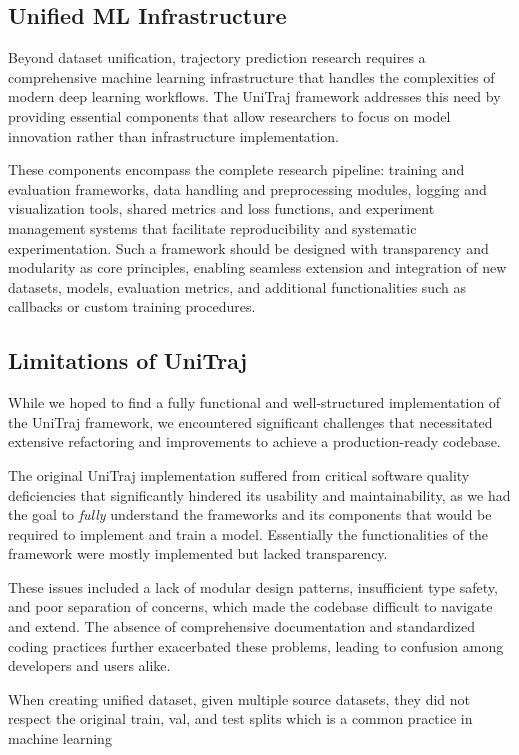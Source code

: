 \subsection{Unified ML Infrastructure}
Beyond dataset unification, trajectory prediction research requires a comprehensive machine learning infrastructure that handles the complexities of modern deep learning workflows. The UniTraj framework addresses this need by providing essential components that allow researchers to focus on model innovation rather than infrastructure implementation.

These components encompass the complete research pipeline: training and evaluation frameworks, data handling and preprocessing modules, logging and visualization tools, shared metrics and loss functions, and experiment management systems that facilitate reproducibility and systematic experimentation. Such a framework should be designed with transparency and modularity as core principles, enabling seamless extension and integration of new datasets, models, evaluation metrics, and additional functionalities such as callbacks or custom training procedures.



\subsection{Limitations of UniTraj}
\label{sec:data_challenges}

While we hoped to find a fully functional and well-structured implementation of the UniTraj framework, we encountered significant challenges that necessitated extensive refactoring and improvements to achieve a production-ready codebase.

The original UniTraj implementation suffered from critical software quality deficiencies that significantly hindered its usability and maintainability, as we had the goal to \emph{fully} understand the frameworks and its components that would be required to implement and train a model. Essentially the functionalities of the framework were mostly implemented but lacked transparency.

These issues included a lack of modular design patterns, insufficient type safety, and poor separation of concerns, which made the codebase difficult to navigate and extend. The absence of comprehensive documentation and standardized coding practices further exacerbated these problems, leading to confusion among developers and users alike.

When creating unified dataset, given multiple source datasets, they did not respect the original train, val, and test splits which is a common practice in machine learning

